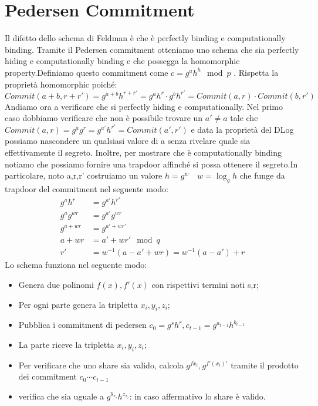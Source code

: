 \documentclass{book}
\begin{document}
\section{Pedersen Commitment}
Il difetto dello schema di Feldman è che è perfectly binding e computationally binding. Tramite il Pedersen commitment otteniamo uno schema che sia perfectly hiding e computationally binding e che possegga la homomorphic property.Definiamo questo commitment come \(c=g^{a}h^{h}\mod{p}\) \@.\newline
Rispetta la proprietà homomorphic poiché:\begin{equation*}
    Commit(a+b,r+r')=g^{a+b}h^{r+r'}=g^{a}h^{r}\cdot g^{b}h^{r'}=Commit(a,r)\cdot Commit(b,r')
\end{equation*}
Andiamo ora a verificare che si perfectly hiding e computationally. Nel primo caso dobbiamo verificare che non è possibile trovare un \(a'\neq a\) tale che \(Commit(a,r)=g^{a}g^{r}=g^{a'}h^{r'}=Commit(a',r')\) e data la proprietà del DLog possiamo nascondere un qualsiasi valore di a senza rivelare quale sia effettivamente il segreto\@.\newline
Inoltre, per mostrare che è computationally binding notiamo che possiamo fornire una trapdoor affinché si possa ottenere il segreto.In particolare, noto a,r,r' costruiamo un valore \(h=g^{w}\quad w=\log_{g}{h}\) che funge da trapdoor del commitment nel seguente modo:\begin{align*}
    g^{a}h^{r}&=g^{a'}h^{r'}\\
    g^{a}g^{wr}&=g^{a'}g^{wr}\\
    g^{a+wr}&=g^{a'+wr'}\\
    a+wr&=a'+wr'\mod{q}\\
    r'&=w^{-1}(a-a'+wr)=w^{-1}(a-a')+r
\end{align*}
Lo schema funziona nel seguente modo:\begin{itemize}
    \item Genera due polinomi \(f(x),f'(x)\) con rispettivi termini noti s,r;
    \item Per ogni parte genera la tripletta \(x_{i},y_{i},z_{i}\);
    \item Pubblica i commitment di pedersen \(c_{0}=g^{s}h^{r},c_{t-1}=g^{a_{t-1}}h^{b_{t-1}}\)
    \item La parte riceve la tripletta \(x_{i},y_{i},z_{i}\);
    \item Per verificare che uno share sia valido, calcola \(g^{f{x_{i}}},g^{f'(x_{i})'}\) tramite il prodotto dei commitment \(c_{0}\cdots c_{t-1}\)
    \item verifica che sia uguale a \(g^{y_{x_{i}}}h^{z_{x_{i}}}\): in caso affermativo lo share è valido.
\end{itemize}
\end{document}
